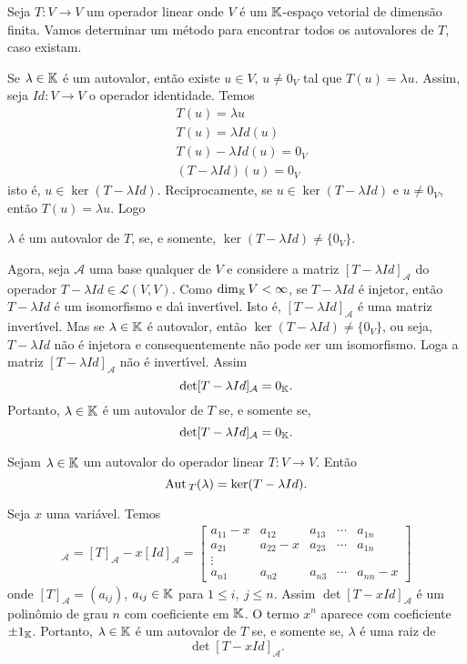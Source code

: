 Seja $T : V \to V$ um operador linear onde $V$ \'e um $\mathbb{K}$-espa\c{c}o vetorial de dimens\~ao finita. Vamos determinar um m\'etodo para encontrar todos os autovalores de $T$, caso existam.

Se $\lambda \in \mathbb{K}$ \'e um autovalor, ent\~ao existe $u \in V$, $u \ne 0_V$ tal que $T(u) = \lambda u$. Assim, seja $Id : V \to V$ o operador identidade. Temos
\begin{align*}
	&T(u) = \lambda u\\
	&T(u) = \lambda Id(u)\\
	&T(u) - \lambda Id(u) = 0_V\\
	&(T - \lambda Id)(u) = 0_V
\end{align*}
isto \'e, $u \in \ker (T - \lambda Id)$. Reciprocamente, se $u \in \ker (T - \lambda Id)$ e $u \ne 0_V$, ent\~ao $T(u) = \lambda u$. Logo
\begin{center}
		$\lambda$ \'e um autovalor de $T$, se, e somente, $\ker (T - \lambda Id) \ne \{0_V\}$.
\end{center}

Agora, seja $\mathcal{A}$ uma base qualquer de $V$ e considere a matriz $[T - \lambda Id]_\mathcal{A}$ do operador $T - \lambda Id \in \mathcal{L}(V,V)$. Como $\dim_{\mathbb{K}}V < \infty$, se $T - \lambda Id$ \'e injetor, ent\~ao $T - \lambda Id$ \'e um isomorfismo e da{\'\i} invert{\'\i}vel. Isto \'e, $[T - \lambda Id]_\mathcal{A}$ \'e uma matriz invert{\'\i}vel. Mas se $\lambda \in \mathbb{K}$ \'e autovalor, ent\~ao $\ker (T - \lambda Id) \ne \{0_V\}$, ou seja, $T - \lambda Id$ n\~ao \'e injetora e consequentemente n\~ao pode ser um isomorfismo. Loga a matriz $[T - \lambda Id]_\mathcal{A}$ n\~ao \'e invert{\'\i}vel. Assim
\[
\det [T - \lambda Id]_\mathcal{A} = 0_{\mathbb{K}}.
\]
Portanto, $\lambda \in \mathbb{K}$ \'e um autovalor de $T$ se, e somente se,
\[
\det [T - \lambda Id]_\mathcal{A} = 0_{\mathbb{K}}.
\]

\begin{proposicao}
	Sejam $\lambda \in \mathbb{K}$ um autovalor do operador linear $T : V \to V$. Ent\~ao
	\[
		{\rm Aut\,}_T(\lambda) = \ker(T - \lambda Id).
	\]
\end{proposicao}

Seja $x$ uma vari\'avel. Temos
\begin{align}
	[T - xId]_\mathcal{A} = [T]_\mathcal{A} - x[Id]_\mathcal{A} = \begin{bmatrix}
		a_{11} - x & a_{12} & a_{13} & \cdots & a_{1n}\\
		a_{21} & a_{22} - x & a_{23} & \cdots & a_{1n}\\
		\vdots\\
		a_{n1} & a_{n2} & a_{n3} & \cdots & a_{nn} - x
	\end{bmatrix}
\end{align}
onde $[T]_\mathcal{A} = (a_{ij})$, $a_{ij} \in \mathbb{K}$ para $1 \le i,\ j \le n$. Assim $\det[T - xId]_\mathcal{A}$ \'e um polin\^omio de grau $n$ com coeficiente em $\mathbb{K}$. O termo $x^n$ aparece com coeficiente $\pm 1_{\mathbb{K}}$. Portanto, $\lambda \in \mathbb{K}$ \'e um autovalor de $T$ se, e somente se, $\lambda$ \'e uma raiz de
\[
\det[T - xId]_\mathcal{A}.
\]

